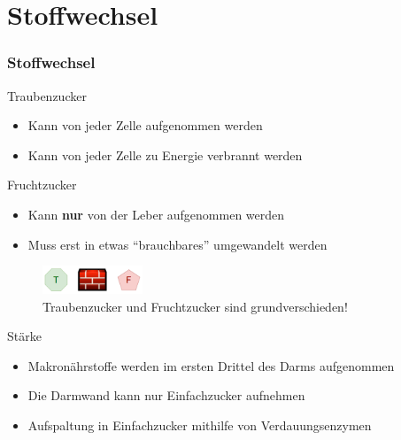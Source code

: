 \documentclass[xcolor=dvipsnames]{beamer}
\begin{document}
    \section{Stoffwechsel}
    \begin{frame}[allowframebreaks]
        \frametitle{Stoffwechsel}

        \begin{block}{Traubenzucker}
            \begin{itemize}
                \setlength\itemsep{1em}
                \item Kann von jeder Zelle aufgenommen werden
                \item Kann von jeder Zelle zu Energie verbrannt werden
            \end{itemize}
        \end{block}

        \begin{block}{Fruchtzucker}
            \begin{itemize}
                \setlength\itemsep{1em}
                \item Kann \textbf{nur} von der Leber aufgenommen werden
                \item Muss erst in etwas "`brauchbares"' umgewandelt werden
            \end{itemize}
        \end{block}

        \begin{figure}
            \centering
            \includegraphics[width=3cm]{../images/wall.png}
            \caption{Traubenzucker und Fruchtzucker sind grundverschieden!}
        \end{figure}

        \framebreak

        \begin{block}{Stärke}
            \begin{itemize}
                \item Makronährstoffe werden im ersten Drittel des Darms aufgenommen
                \item Die Darmwand kann nur Einfachzucker aufnehmen
                \item Aufspaltung in Einfachzucker mithilfe von Verdauungsenzymen
            \end{itemize}
        \end{block}


\end{frame}
\end{document}
